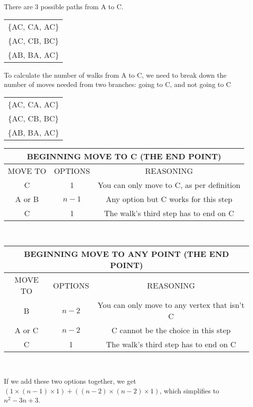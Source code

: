 \documentclass[12pt]{article}
\begin{document}
There are 3 possible paths from A to C. \\
\begin{center}
\begin{tabular}{|c|}  \hline
\{AC, CA, AC\} \\
\{AC, CB, BC\} \\
\{AB, BA, AC\} \\ \hline
\end{tabular}
\end{center}

To calculate the number of walks from A to C, we need to break down the number of moves needed from two branches: going to C, and not going to C
\begin{center}
\begin{tabular}{|c|}  \hline
\{AC, CA, AC\} \\
\{AC, CB, BC\} \\ \hline
\{AB, BA, AC\} \\ \hline
\end{tabular}


\begin{tabular}{|c|c|c|}
\multicolumn{3}{c}{BEGINNING MOVE TO C (THE END POINT)}  \\ \hline
MOVE TO & OPTIONS & REASONING \\ \hline
C & 1 & You can only move to C, as per definition \\ \hline
A or B &$n-1$ & Any option but C works for this step \\ \hline
C & 1 & The walk's third step has to end on C \\ \hline
\end{tabular} \\


\begin{tabular}{|c|c|c|}
\multicolumn{3}{c}{BEGINNING MOVE TO ANY POINT (THE END POINT)}  \\ \hline
MOVE TO & OPTIONS & REASONING \\ \hline
B & $n-2$ & You can only move to any vertex that isn't C \\ \hline
A or C & $n-2$ & C cannot be the choice in this step \\ \hline
C & 1 & The walk's third step has to end on C \\ \hline
\end{tabular} \\
\end{center}

If we add these two options together, we get $(1 \times (n-1) \times 1) +  ((n-2) \times (n-2) \times 1)$, which simplifies to $n^{2} - 3n +3$. \\
\end{document}
